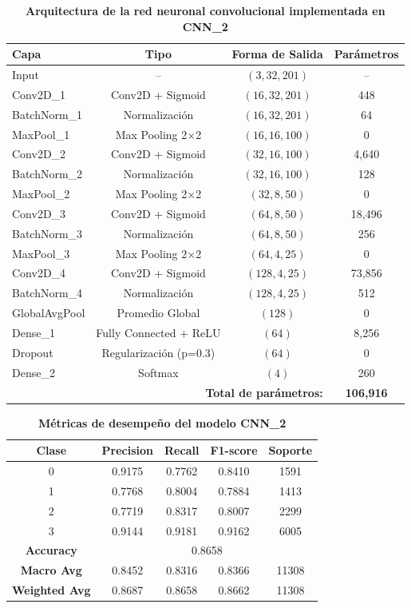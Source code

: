 \documentclass[12pt]{report}
\begin{document}
\begin{table}[htbp]
\centering
\caption{\textbf{Arquitectura de la red neuronal convolucional implementada en CNN\_2}}
\label{tab:cnn2_architecture}
\begin{tabular}{|l|c|c|c|}
\hline
\textbf{Capa} & \textbf{Tipo} & \textbf{Forma de Salida} & \textbf{Parámetros} \\
\hline
Input & -- & $(3, 32, 201)$ & -- \\
\hline
Conv2D\_1 & Conv2D + Sigmoid & $(16, 32, 201)$ & 448 \\
BatchNorm\_1 & Normalización & $(16, 32, 201)$ & 64 \\
MaxPool\_1 & Max Pooling 2×2 & $(16, 16, 100)$ & 0 \\
\hline
Conv2D\_2 & Conv2D + Sigmoid & $(32, 16, 100)$ & 4,640 \\
BatchNorm\_2 & Normalización & $(32, 16, 100)$ & 128 \\
MaxPool\_2 & Max Pooling 2×2 & $(32, 8, 50)$ & 0 \\
\hline
Conv2D\_3 & Conv2D + Sigmoid & $(64, 8, 50)$ & 18,496 \\
BatchNorm\_3 & Normalización & $(64, 8, 50)$ & 256 \\
MaxPool\_3 & Max Pooling 2×2 & $(64, 4, 25)$ & 0 \\
\hline
Conv2D\_4 & Conv2D + Sigmoid & $(128, 4, 25)$ & 73,856 \\
BatchNorm\_4 & Normalización & $(128, 4, 25)$ & 512 \\
GlobalAvgPool & Promedio Global & $(128)$ & 0 \\
\hline
Dense\_1 & Fully Connected + ReLU & $(64)$ & 8,256 \\
Dropout & Regularización (p=0.3) & $(64)$ & 0 \\
Dense\_2 & Softmax & $(4)$ & 260 \\
\hline
\multicolumn{3}{|r|}{\textbf{Total de parámetros:}} & \textbf{106,916} \\
\hline
\end{tabular}
\end{table}

\begin{table}[H]
\centering
\caption{\textbf{Métricas de desempeño del modelo CNN\_2}}
\label{tab:cnn2_metrics}
\begin{tabular}{|c|c|c|c|c|}
\hline
\textbf{Clase} & \textbf{Precision} & \textbf{Recall} & \textbf{F1-score} & \textbf{Soporte} \\
\hline
0 & 0.9175 & 0.7762 & 0.8410 & 1591 \\
1 & 0.7768 & 0.8004 & 0.7884 & 1413 \\
2 & 0.7719 & 0.8317 & 0.8007 & 2299 \\
3 & 0.9144 & 0.9181 & 0.9162 & 6005 \\
\hline
\textbf{Accuracy} & \multicolumn{4}{c|}{0.8658} \\
\hline
\textbf{Macro Avg} & 0.8452 & 0.8316 & 0.8366 & 11308 \\
\textbf{Weighted Avg} & 0.8687 & 0.8658 & 0.8662 & 11308 \\
\hline
\end{tabular}
\end{table}
\end{document}
